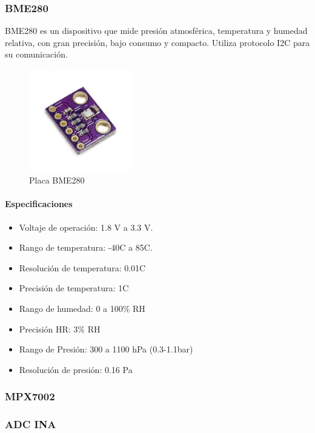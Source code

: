 	
	\subsubsection{BME280}
	BME280 es un dispositivo que mide presión atmosférica, temperatura y humedad relativa, con gran precisión, bajo consumo y compacto. Utiliza protocolo I2C para su comunicación.

	
	\begin{figure}
		\includegraphics[width=0.4\textwidth]{bme280.png}
		\caption{Placa BME280}
		\label{fig:BME280}
	\end{figure}
		\paragraph*{Especificaciones}
		\begin{itemize}
		\item   Voltaje de operación: 1.8 V a 3.3 V.
		\item	Rango de temperatura: -40\grad C a 85\grad C.
		\item   Resolución de temperatura: 0.01\grad C
		\item	Precisión de temperatura: 1\grad C 
		\item	Rango de humedad: 0 a 100\% RH
		\item   Precisión HR: 3\% RH
		\item Rango de Presión: 300 a 1100 hPa (0.3-1.1bar)
		\item Resolución de presión: 0.16 Pa
	\end{itemize}
	
	\subsubsection{MPX7002}
    \subsubsection{ADC INA}

